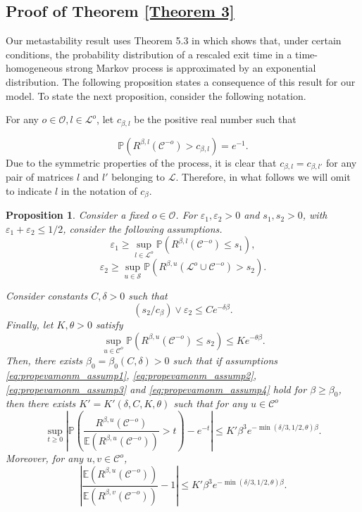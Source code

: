 \documentclass[11pt]{article}
\newtheorem{proposition}[theorem]{Proposition}
\theoremstyle{definition}
\newcommand{\opn}{\mathcal{O}}
\def\P{{\mathbb P}}
\begin{document}
\subsection{Proof of Theorem \ref{Theorem 3}} \label{subsec:T3}

Our metastability result uses Theorem 5.3 in  \cite{evamonm} which shows that, under certain conditions, the probability distribution of a rescaled exit time in a time-homogeneous strong Markov process is approximated by an exponential distribution. The following proposition states a consequence of this result for our model. To state the next proposition, consider the following notation.

For any $o\in\mathcal{O}, l\in\mathcal{L}^{o}$, 
let $c_{\beta,l}$ be the positive real number such that

$$
    \mathbb{P}(R^{\beta,l}(\mathcal{C}^{-o})>c_{\beta,l})=e^{-1}.
$$
Due to the symmetric properties of the process, it is clear that $c_{\beta,l}=c_{\beta,l'}$ for any pair of matrices $l$ and $l'$ belonging to $\mathcal{L}$. Therefore, in what follows we will omit to indicate $l$ in the notation of $c_\beta$. 

\begin{proposition} \label{prop:evamonm}
Consider a fixed $o\in \opn$.
For $\varepsilon_1, \varepsilon_2 >0$ and $s_1,s_2 >0$, with $\varepsilon_1 +\varepsilon_2 \leq 1/2$, consider the following assumptions. 
\begin{equation} \label{eq:propevamonm_assump1}
\varepsilon_1 \geq  \sup_{l\in \mathcal{L}^o}\P(R^{\beta,l}(\mathcal{C}^{-o}) \leq s_1),
\end{equation}
\begin{equation} \label{eq:propevamonm_assump2}
\varepsilon_2 \geq \sup_{u\in \mathcal{S}} \P(R^{\beta,u}(\mathcal{L}^o\cup\mathcal{C}^{-o}) > s_2).
\end{equation}

Consider constants $C,\delta>0$ such that
\begin{equation} \label{eq:propevamonm_assump3}
(s_2/c_{\beta}) \vee\varepsilon_2 \leq Ce^{-\delta \beta}.
\end{equation}
Finally, let $K,\theta>0$ satisfy
\begin{equation} \label{eq:propevamonm_assump4}
\sup_{u\in \mathcal{C}^o}\P(R^{\beta,u}(\mathcal{C}^{-o}) \leq s_2) \leq Ke^{-\theta \beta}.
\end{equation}
Then, there exists $\beta_0=\beta_0(C,\delta)>0$ such that if assumptions \eqref{eq:propevamonm_assump1}, \eqref{eq:propevamonm_assump2}, \eqref{eq:propevamonm_assump3} and \eqref{eq:propevamonm_assump4} hold for $\beta\geq \beta_0$, then there exists
$K'=K'(\delta,C,K,\theta)$ such that for any $u\in \mathcal{C}^o$ 
$$
\sup_{t\geq 0}\left|\P\left(\frac{R^{\beta,u}(\mathcal{C}^{-o})}{\mathbb{E}(R^{\beta,u}(\mathcal{C}^{-o}))}>t\right)-e^{-t}\right| \leq K'\beta^3e^{-\min(\delta/3,1/2,\theta) \beta}.
$$
Moreover, for any $u,v \in \mathcal{C}^o$,
$$
\left|\frac{\mathbb{E}(R^{\beta,u}(\mathcal{C}^{-o}))}{\mathbb{E}(R^{\beta,v}(\mathcal{C}^{-o}))}-1\right| \leq K'\beta^3e^{-\min(\delta/3,1/2,\theta) \beta}.
$$
\end{proposition}
\end{document}
